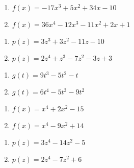 \documentclass{ximera}
\begin{document}
\begin{multicols}{2}
\begin{enumerate}
\setcounter{enumi}{\value{HW}}

\item $f(x) = -17x^{3} + 5x^{2} + 34x - 10$
\item $f(x) = 36x^{4} - 12x^{3} - 11x^{2} + 2x + 1$

\setcounter{HW}{\value{enumi}}
\end{enumerate}
\end{multicols}

\begin{multicols}{2}
\begin{enumerate}
\setcounter{enumi}{\value{HW}}

\item $p(z) = 3z^{3} + 3z^{2} - 11z - 10$
\item $p(z) = 2z^4+z^3-7z^2-3z+3$

\setcounter{HW}{\value{enumi}}
\end{enumerate}
\end{multicols}

\begin{multicols}{2}
\begin{enumerate}
\setcounter{enumi}{\value{HW}}

\item $g(t) = 9t^{3} - 5t^{2} - t$
\item $g(t) = 6t^{4} - 5t^{3} - 9t^{2}$

\setcounter{HW}{\value{enumi}}
\end{enumerate}
\end{multicols}

\begin{multicols}{2}
\begin{enumerate}
\setcounter{enumi}{\value{HW}}

\item $f(x) = x^4+2x^2 - 15$
\item $f(x) = x^4-9x^2+14$

\setcounter{HW}{\value{enumi}}
\end{enumerate}
\end{multicols}

\begin{multicols}{2}
\begin{enumerate}
\setcounter{enumi}{\value{HW}}

\item $p(z) = 3z^4-14z^2-5$
\item $p(z) = 2z^4-7z^2+6$

\setcounter{HW}{\value{enumi}}
\end{enumerate}
\end{multicols}
\end{document}
